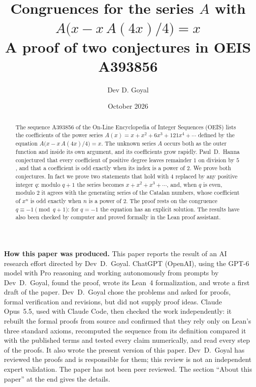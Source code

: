 \documentclass[11pt,a4paper]{article}
\title{Congruences for the series $A$ with $A\bigl(x-x\,A(4x)/4\bigr)=x$\\[6pt]\large A proof of two conjectures in OEIS A393856}
\author{Dev D. Goyal}
\date{October 2026}
\theoremstyle{definition}
\theoremstyle{remark}
\begin{document}
\maketitle
\begin{abstract}
The sequence A393856 of the On-Line Encyclopedia of Integer Sequences (OEIS) lists the coefficients of the power
series $A(x)=x+x^2+6x^3+121x^4+\cdots$ defined by the equation
$A\bigl(x-x\,A(4x)/4\bigr)=x$. The unknown series $A$ occurs both as the outer function and inside its own argument, and its coefficients grow rapidly.
Paul~D.~Hanna conjectured that every coefficient of positive degree leaves remainder $1$ on division by $5$, and that a coefficient is odd exactly when its index is a power of $2$. We prove both conjectures. In fact we prove two statements that hold with $4$ replaced by any positive integer $q$: modulo $q+1$ the series becomes $x+x^2+x^3+\cdots$, and, when $q$ is even, modulo $2$ it agrees with the generating series of the Catalan numbers, whose coefficient of $x^n$ is odd exactly when $n$ is a power of $2$. The proof rests on the congruence $q\equiv-1\pmod{q+1}$: for $q=-1$ the equation
has an explicit solution. The results have also been checked by computer and proved formally in the
Lean proof assistant.
\end{abstract}
\begin{center}\begin{minipage}{0.88\linewidth}\small
\textbf{How this paper was produced.} This paper reports the result of an AI research effort directed by
Dev~D.~Goyal. ChatGPT (OpenAI), using the GPT-6 model with Pro reasoning and working autonomously from prompts by
Dev~D.~Goyal, found the proof, wrote its Lean~4 formalization, and wrote a first draft of the paper.
Dev~D.~Goyal chose the problems and asked for proofs, formal verification and revisions, but did not supply proof
ideas. Claude Opus~5.5, used with Claude Code, then checked the work independently: it rebuilt the formal proofs from
source and confirmed that they rely only on Lean's three standard axioms, recomputed the sequence from its definition
compared it with the published terms and tested every claim numerically, and read every step of the proofs. It also wrote the present
version of this paper.
Dev~D.~Goyal has reviewed the proofs and is responsible for them; this review is not an independent expert validation.
The paper has not been peer reviewed.
The section ``About this paper'' at the end gives the details.
\end{minipage}\end{center}
\end{document}
